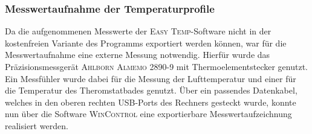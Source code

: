 \subsubsection*{Messwertaufnahme der Temperaturprofile}
Da die aufgenommenen Messwerte der \textsc{Easy Temp}-Software nicht in der kostenfreien Variante des Programms exportiert werden können, war für die Messwertaufnahme eine externe Messung notwendig. Hierfür wurde das Präzisionsmessgerät \textsc{Ahlborn Almemo 2890-9} mit Thermoelementstecker genutzt. Ein Messfühler wurde dabei für die Messung der Lufttemperatur und einer für die Temperatur des Theromstatbades genutzt. Über ein passendes Datenkabel, welches in den oberen rechten USB-Ports des Rechners gesteckt wurde, konnte nun über die Software \textsc{WinControl} eine exportierbare Messwertaufzeichnung realisiert werden.
%

